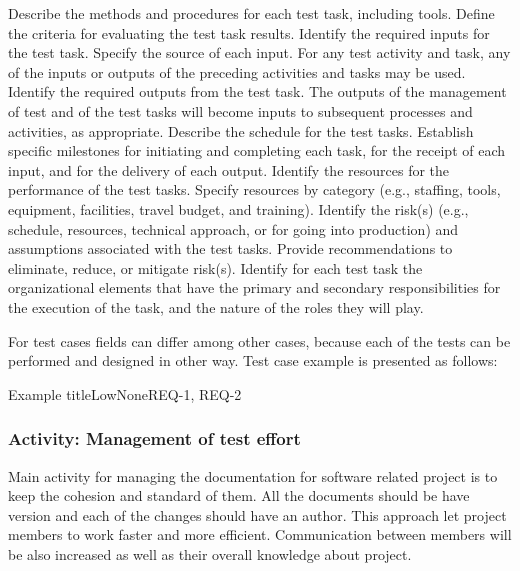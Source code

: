 	{
		{
			Describe the methods and procedures for each test task, including tools. Define
			the criteria for evaluating the test task results.
		}
		{
			Identify the required inputs for the test task. Specify the source of each input. For
			any test activity and task, any of the inputs or outputs of the preceding activities and tasks
			may be used.
		}
		{
			Identify the required outputs from the test task. The outputs of the management of
			test and of the test tasks will become inputs to subsequent processes and activities, as
			appropriate.
		}
		{
			Describe the schedule for the test tasks. Establish specific milestones for
			initiating and completing each task, for the receipt of each input, and for the delivery of
			each output.
		}
		{
			Identify the resources for the performance of the test tasks. Specify resources by
			category (e.g., staffing, tools, equipment, facilities, travel budget, and training).
		}
		{
			Identify the risk(s) (e.g., schedule, resources, technical approach, or
			for going into production) and assumptions associated with the test tasks. Provide
			recommendations to eliminate, reduce, or mitigate risk(s).
		}
		{
			Identify for each test task the organizational elements that have
			the primary and secondary responsibilities for the execution of the task, and the nature of the roles they will play.
		}
	}

	For test cases fields can differ among other cases, because each of the tests can be performed and designed in other way. Test case example is presented as follows:
	\begin{testcase}{Example title}{Low}{None}{REQ-1, REQ-2}
	\end{testcase}

		\subsubsection{Activity: Management of test effort} \label{s:details-of-the-master-test-plan:activity-management-of-test-effort}
		Main activity for managing the documentation for software related project is to keep the cohesion and standard of them. All the documents should be have version and each of the changes should have an author. This approach let project members to work faster and more efficient. Communication between members will be also increased as well as their overall knowledge about project.
